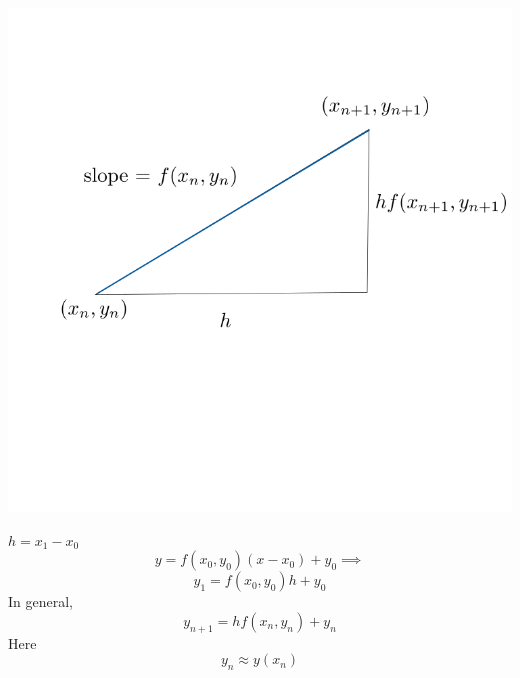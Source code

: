 \documentclass[10pt,a4paper]{article}
\begin{document}
  \begin{flushleft}
    \includegraphics[scale=.3]{euler2}
  \end{flushleft}
  \( h = x_1-x_0 \)
  \[ y = f(x_0, y_0)(x-x_0) + y_0 \implies \]
  \[ y_1 = f(x_0, y_0)h + y_0 \]
  In general, 
  \[ \boxed{ y_{n+1} = hf(x_n,y_n) + y_n} \]
  Here
  \[ \boxed{ y_n \approx y(x_n)} \]
\end{document}
